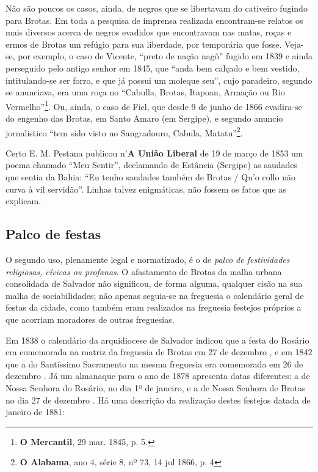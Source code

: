 Não são poucos os casos, ainda, de negros que se libertavam do cativeiro fugindo para Brotas. Em toda a pesquisa de imprensa realizada encontram-se relatos os mais diversos acerca de negros evadidos que encontravam nas matas, roças e ermos de Brotas um refúgio para sua liberdade, por temporária que fosse. Veja-se, por exemplo, o caso de Vicente, ``preto de nação nagô'' fugido em 1839 e ainda perseguido pelo antigo senhor em 1845, que ``anda bem calçado e bem vestido, intitulando-se ser forro, e que já possui um moleque seu'', cujo paradeiro, segundo se anunciava, era uma roça no ``Cabulla, Brotas, Itapoan, Armação ou Rio Vermelho''\footnote{\textbf{O Mercantil}, 29 mar. 1845, p. 5.}. Ou, ainda, o caso de Fiel, que desde 9 de junho de 1866 evadira-se do engenho das Brotas, em Santo Amaro (em Sergipe), e segundo anuncio jornalistico ``tem sido visto no Sangradouro, Cabula, Matatu''\footnote{\textbf{O Alabama}, ano 4, série 8, nº 73, 14 jul 1866, p. 4}. 

Certo E. M. Pestana publicou n'\textbf{A União Liberal} de 19 de março de 1853 um poema chamado ``Meu Sentir'', declamando de Estância (Sergipe) as saudades que sentia da Bahia: ``Eu tenho saudades também de Brotas / Qu'o collo não curva à vil servidão''. Linhas talvez enigmáticas, não fossem os fatos que as explicam.

\subsection{Palco de festas}

O segundo uso, plenamente legal e normatizado, é o de \textit{palco de festividades religiosas, cívicas ou profanas}. O afastamento de Brotas da malha urbana consolidada de Salvador não significou, de forma alguma, qualquer cisão na sua malha de sociabilidades; não apenas seguia-se na freguesia o calendário geral de festas da cidade, como também eram realizados na freguesia festejos próprios a que acorriam moradores de outras freguesias.

Em 1838 o calendário da arquidiocese de Salvador indicou que a festa do Rosário era comemorada na matriz da freguesia de Brotas em 27 de dezembro \cite[p.~44]{arcebis_diario_1837}, e em 1842 que a do Santíssimo Sacramento na mesma freguesia era comemorada em 26 de dezembro \cite[p.~55]{arcebis_folhinha_1841}. Já um almanaque para o ano de 1878 apresenta datas diferentes: a de Nossa Senhora do Rosário, no dia 1º de janeiro, e a de Nossa Senhora de Brotas no dia 27 de dezembro \cite[pp.~53,~109]{macosta_almana_1877}. Há uma descrição da realização destes festejos datada de janeiro de 1881:


